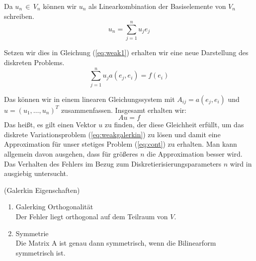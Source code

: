 Da $u_n \, \in \, V_n$ können wir $u_n$ als Linearkombination der Basiselemente von $V_n$ schreiben.
\begin{equation}
u_n = \sum_{j=1}^{n} u_j e_j
\end{equation}

Setzen wir dies in Gleichung (\ref{eq:weak1}) erhalten wir eine neue Darstellung des diskreten Problems.
\begin{equation}
\sum_{j=1}^{n} u_j a( e_j, e_i ) = f(e_i)
\end{equation}

Das können wir in einem linearen Gleichungssystem mit $A_{ij}=a(e_j,e_i)$ und $u=(u_1,\dots,u_n)^{T}$ zusammenfassen. Insgesamt erhalten wir:
\begin{equation}
Au=f
\end{equation}
Das heißt, es gilt einen Vektor $u$ zu finden, der diese Gleichheit erfüllt, um das diskrete Variationsproblem (\ref{eq:weakgalerkin}) zu lösen und damit eine Approximation für unser stetiges Problem (\ref{eq:cont}) zu erhalten. Man kann allgemein davon ausgehen, dass für größeres $n$ die Approximation besser wird. Das Verhalten des Fehlers im Bezug zum Diskretierisierungsparameters $n$ wird in \cite[154]{Numerik} ausgiebig untersucht.

\newpage

\begin{Bemerkung} (Galerkin Eigenschaften) 
\begin{enumerate} 
\item Galerking Orthogonalität \\
Der Fehler liegt orthogonal auf dem Teilraum von $V$.
\item Symmetrie \\
Die Matrix A ist genau dann symmetrisch, wenn die Bilinearform symmetrisch ist.
\end{enumerate}
\end{Bemerkung}

